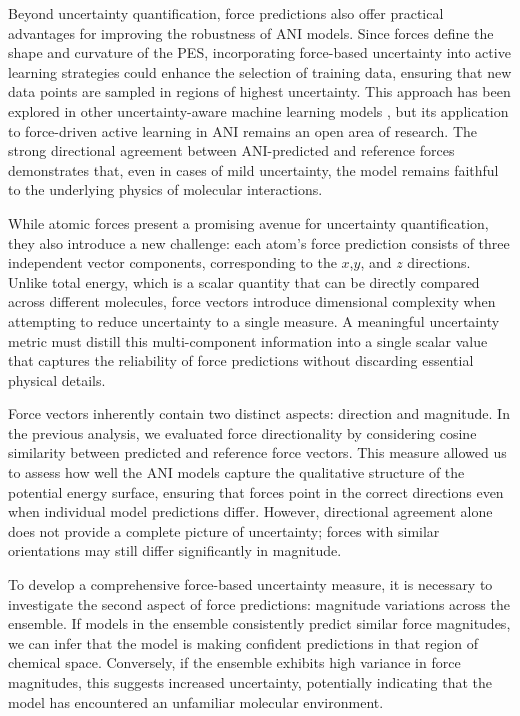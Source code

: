Beyond uncertainty quantification, force predictions also offer practical advantages for improving the robustness of ANI models. 
Since forces define the shape and curvature of the PES, incorporating force-based uncertainty into active learning strategies could enhance the selection of training data, ensuring that new data points are sampled in regions of highest uncertainty. 
This approach has been explored in other uncertainty-aware machine learning models \cite{uncertainty_atomistic_ml_peterson}, but its application to force-driven active learning in ANI remains an open area of research.
The strong directional agreement between ANI-predicted and reference forces demonstrates that, even in cases of mild uncertainty, the model remains faithful to the underlying physics of molecular interactions.

While atomic forces present a promising avenue for uncertainty quantification, they also introduce a new challenge: each atom's force prediction consists of three independent vector components, corresponding to the $x$,$y$, and $z$ directions. 
Unlike total energy, which is a scalar quantity that can be directly compared across different molecules, force vectors introduce dimensional complexity when attempting to reduce uncertainty to a single measure. 
A meaningful uncertainty metric must distill this multi-component information into a single scalar value that captures the reliability of force predictions without discarding essential physical details.

Force vectors inherently contain two distinct aspects: direction and magnitude. 
In the previous analysis, we evaluated force directionality by considering cosine similarity between predicted and reference force vectors. 
This measure allowed us to assess how well the ANI models capture the qualitative structure of the potential energy surface, ensuring that forces point in the correct directions even when individual model predictions differ. 
However, directional agreement alone does not provide a complete picture of uncertainty; forces with similar orientations may still differ significantly in magnitude.

To develop a comprehensive force-based uncertainty measure, it is necessary to investigate the second aspect of force predictions: magnitude variations across the ensemble. If models in the ensemble consistently predict similar force magnitudes, we can infer that the model is making confident predictions in that region of chemical space. Conversely, if the ensemble exhibits high variance in force magnitudes, this suggests increased uncertainty, potentially indicating that the model has encountered an unfamiliar molecular environment.

